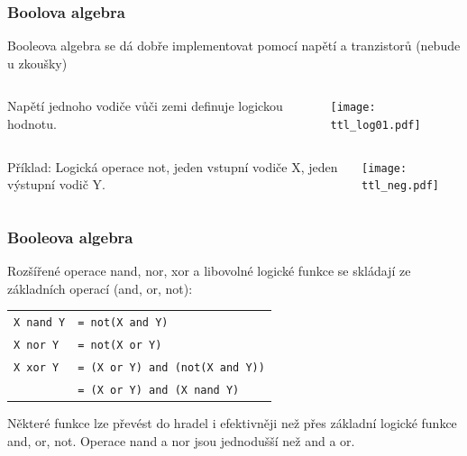 \documentclass{beamer}
\begin{document}
\begin{frame}
\frametitle{Boolova algebra}

Booleova algebra se dá dobře implementovat pomocí napětí a tranzistorů (nebude u zkoušky)

\begin{columns}
\begin{column}{0.45\textwidth}
Napětí jednoho vodiče vůči zemi definuje logickou hodnotu.
\end{column}
\begin{column}{0.55\textwidth}  
\begin{center}
   \texttt{[image: ttl\_log01.pdf]}
\end{center}
\end{column}
\end{columns}

\begin{columns}
\begin{column}{0.45\textwidth}
Příklad: Logická operace not, jeden vstupní vodiče X, jeden výstupní vodič Y.
\end{column}
\begin{column}{0.55\textwidth}  
\begin{center}
   \texttt{[image: ttl\_neg.pdf]}
\end{center}
\end{column}
\end{columns}


\end{frame}

\begin{frame}
\frametitle{Booleova algebra}

Rozšířené operace nand, nor, xor a libovolné logické funkce se skládají ze základních operací (and, or, not):

\begin{tabular}{ll}
\texttt{X nand Y} & \texttt{= not(X and Y)}\\
\texttt{X nor Y} & \texttt{= not(X or Y)}\\
\texttt{X xor Y} & \texttt{= (X or Y) and (not(X and Y))}\\
& \texttt{= (X or Y) and (X nand Y)}\\
\end{tabular}

Některé funkce lze převést do hradel i efektivněji než přes základní logické funkce and, or, not.
Operace nand a nor jsou jednodušší než and a or.
\end{frame}
\end{document}
